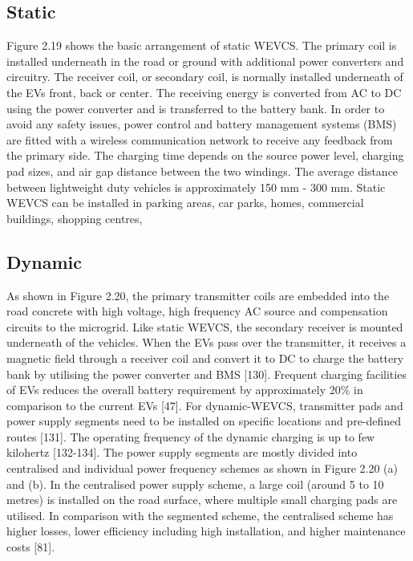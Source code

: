 \documentclass[12pt]{article}
\begin{document}
\subsection{Static}
Figure 2.19 shows the basic arrangement of static WEVCS. The primary coil is installed
underneath in the road or ground with additional power converters and circuitry. The
receiver coil, or secondary coil, is normally installed underneath of the EVs front, back
or center. The receiving energy is converted from AC to DC using the power converter
and is transferred to the battery bank. In order to avoid any safety issues, power control
and battery management systems (BMS) are fitted with a wireless communication
network to receive any feedback from the primary side. The charging time depends on
the source power level, charging pad sizes, and air gap distance between the two
windings. The average distance between lightweight duty vehicles is approximately 150
mm - 300 mm. Static WEVCS can be installed in parking areas, car parks, homes,
commercial buildings, shopping centres,
  
  \subsection{Dynamic}
  As
shown in Figure 2.20, the primary transmitter coils are embedded into the road concrete with high voltage, high frequency AC source and compensation circuits to the microgrid. Like static WEVCS, the secondary receiver is mounted underneath of the vehicles. When the EVs pass over the transmitter, it receives a magnetic field through a receiver coil and convert it to DC to charge the battery bank by utilising the power converter and BMS [130]. Frequent charging facilities of EVs reduces the overall battery
requirement by approximately 20\% in comparison to the current EVs [47]. For dynamic-WEVCS, transmitter pads and power supply segments need to be installed on specific
locations and pre-defined routes [131]. The operating frequency of the dynamic charging is up to few kilohertz [132-134]. The power supply segments are mostly divided into centralised and individual power frequency schemes as shown in Figure 2.20 (a) and (b). In the centralised power supply scheme, a large coil (around 5 to 10 metres) is installed on the road surface, where multiple small charging pads are utilised. In comparison with the segmented scheme, the centralised scheme has higher losses, lower efficiency including high installation, and higher maintenance costs [81].


\end{document}
